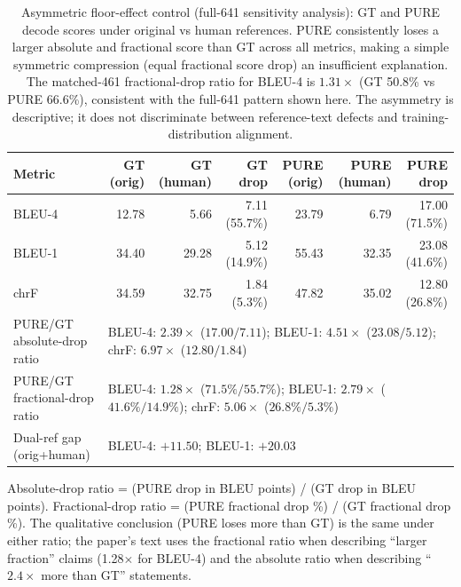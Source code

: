 \documentclass[pdflatex,sn-chicago]{sn-jnl}
\begin{document}
\begin{table}[h]
\centering
\scriptsize
\caption{Asymmetric floor-effect control (full-641 sensitivity analysis): GT and PURE decode scores under original vs human references. PURE consistently loses a larger absolute and fractional score than GT across all metrics, making a simple symmetric compression (equal fractional score drop) an insufficient explanation. The matched-461 fractional-drop ratio for BLEU-4 is $1.31\times$ (GT 50.8\% vs PURE 66.6\%), consistent with the full-641 pattern shown here. The asymmetry is descriptive; it does not discriminate between reference-text defects and training-distribution alignment.}
\label{tab:floor_effect}
\begin{tabular}{lrrrrrr}
\toprule
Metric & GT (orig) & GT (human) & GT drop & PURE (orig) & PURE (human) & PURE drop \\
\midrule
BLEU-4 & 12.78 & 5.66 & 7.11 (55.7\%) & 23.79 & 6.79 & 17.00 (71.5\%) \\
BLEU-1 & 34.40 & 29.28 & 5.12 (14.9\%) & 55.43 & 32.35 & 23.08 (41.6\%) \\
chrF   & 34.59 & 32.75 & 1.84 (5.3\%)  & 47.82 & 35.02 & 12.80 (26.8\%) \\
\midrule
PURE/GT absolute-drop ratio & \multicolumn{6}{l}{BLEU-4: $2.39\times$ ($17.00/7.11$); BLEU-1: $4.51\times$ ($23.08/5.12$); chrF: $6.97\times$ ($12.80/1.84$)} \\
PURE/GT fractional-drop ratio & \multicolumn{6}{l}{BLEU-4: $1.28\times$ ($71.5\%/55.7\%$); BLEU-1: $2.79\times$ ($41.6\%/14.9\%$); chrF: $5.06\times$ ($26.8\%/5.3\%$)} \\
Dual-ref gap (orig+human) & \multicolumn{6}{l}{BLEU-4: $+11.50$; BLEU-1: $+20.03$} \\
\bottomrule
\end{tabular}
\par\smallskip
{\footnotesize Absolute-drop ratio = (PURE drop in BLEU points) / (GT drop in BLEU points). Fractional-drop ratio = (PURE fractional drop \%) / (GT fractional drop \%). The qualitative conclusion (PURE loses more than GT) is the same under either ratio; the paper's text uses the fractional ratio when describing ``larger fraction'' claims (1.28$\times$ for BLEU-4) and the absolute ratio when describing ``$2.4\times$ more than GT'' statements.}
\end{table}
\end{document}
